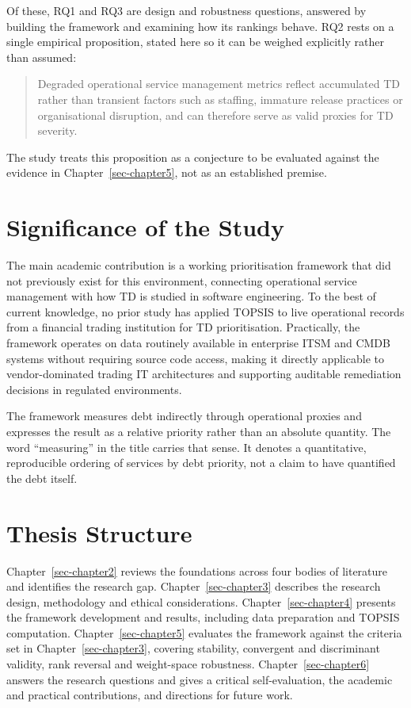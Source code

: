 \documentclass[
  12pt,
  letterpaper,
  12pt,
  oneside,
  english,
  onehalfspacing,
  headsepline]{MastersDoctoralThesis}
\begin{document}
Of these, RQ1 and RQ3 are design and robustness questions, answered by
building the framework and examining how its rankings behave. RQ2 rests
on a single empirical proposition, stated here so it can be weighed
explicitly rather than assumed:

\begin{quote}
Degraded operational service management metrics reflect accumulated TD
rather than transient factors such as staffing, immature release
practices or organisational disruption, and can therefore serve as valid
proxies for TD severity.
\end{quote}

The study treats this proposition as a conjecture to be evaluated
against the evidence in Chapter~\ref{sec-chapter5}, not as an
established premise.

\section{Significance of the Study}\label{significance-of-the-study}

The main academic contribution is a working prioritisation framework
that did not previously exist for this environment, connecting
operational service management with how TD is studied in software
engineering. To the best of current knowledge, no prior study has
applied TOPSIS to live operational records from a financial trading
institution for TD prioritisation. Practically, the framework operates
on data routinely available in enterprise ITSM and CMDB systems without
requiring source code access, making it directly applicable to
vendor-dominated trading IT architectures and supporting auditable
remediation decisions in regulated environments.

The framework measures debt indirectly through operational proxies and
expresses the result as a relative priority rather than an absolute
quantity. The word ``measuring'' in the title carries that sense. It
denotes a quantitative, reproducible ordering of services by debt
priority, not a claim to have quantified the debt itself.

\section{Thesis Structure}\label{thesis-structure}

Chapter~\ref{sec-chapter2} reviews the foundations across four bodies of
literature and identifies the research gap. Chapter~\ref{sec-chapter3}
describes the research design, methodology and ethical considerations.
Chapter~\ref{sec-chapter4} presents the framework development and
results, including data preparation and TOPSIS computation.
Chapter~\ref{sec-chapter5} evaluates the framework against the criteria
set in Chapter~\ref{sec-chapter3}, covering stability, convergent and
discriminant validity, rank reversal and weight-space robustness.
Chapter~\ref{sec-chapter6} answers the research questions and gives a
critical self-evaluation, the academic and practical contributions, and
directions for future work.
\end{document}
